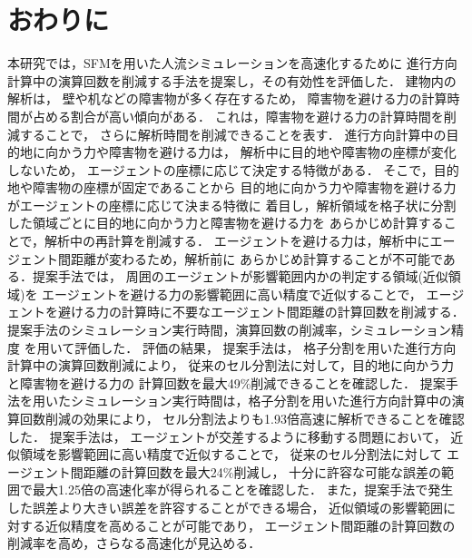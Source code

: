 \chapter{おわりに}
\label{sec:discuss}
本研究では，SFMを用いた人流シミュレーションを高速化するために
進行方向計算中の演算回数を削減する手法を提案し，その有効性を評価した．
建物内の解析は，
壁や机などの障害物が多く存在するため，
障害物を避ける力の計算時間が占める割合が高い傾向がある．
これは，障害物を避ける力の計算時間を削減することで，
さらに解析時間を削減できることを表す．
進行方向計算中の目的地に向かう力や障害物を避ける力は，
解析中に目的地や障害物の座標が変化しないため，
エージェントの座標に応じて決定する特徴がある．
そこで，目的地や障害物の座標が固定であることから
目的地に向かう力や障害物を避ける力がエージェントの座標に応じて決まる特徴に
着目し，解析領域を格子状に分割した領域ごとに目的地に向かう力と障害物を避ける力を
あらかじめ計算することで，解析中の再計算を削減する．
エージェントを避ける力は，解析中にエージェント間距離が変わるため，解析前に
あらかじめ計算することが不可能である．提案手法では，
周囲のエージェントが影響範囲内かの判定する領域(近似領域)を
エージェントを避ける力の影響範囲に高い精度で近似することで，
エージェントを避ける力の計算時に不要なエージェント間距離の計算回数を削減する．
提案手法のシミュレーション実行時間，演算回数の削減率，シミュレーション精度
を用いて評価した．
評価の結果，
提案手法は，
格子分割を用いた進行方向計算中の演算回数削減により，
従来のセル分割法に対して，目的地に向かう力と障害物を避ける力の
計算回数を最大49\%削減できることを確認した．
提案手法を用いたシミュレーション実行時間は，格子分割を用いた進行方向計算中の演算回数削減の効果により，
セル分割法よりも1.93倍高速に解析できることを確認した．
提案手法は，
エージェントが交差するように移動する問題において，
近似領域を影響範囲に高い精度で近似することで，
従来のセル分割法に対して
エージェント間距離の計算回数を最大24\%削減し，
十分に許容な可能な誤差の範囲で最大1.25倍の高速化率が得られることを確認した．
また，提案手法で発生した誤差より大きい誤差を許容することができる場合，
近似領域の影響範囲に対する近似精度を高めることが可能であり，
エージェント間距離の計算回数の削減率を高め，さらなる高速化が見込める．



